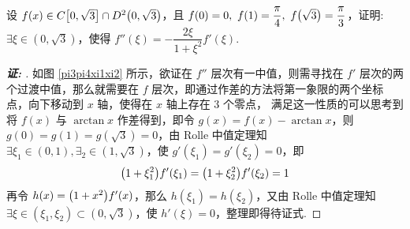 \begin{example}
    设 $f(x)\in C\qty[0,\sqrt{3}]\cap D^2\qty(0,\sqrt{3})$，且 $f(0)=0,~f(1)=\dfrac{\pi}{4},~f\qty(\sqrt{3})=\dfrac{\pi}{3}$，证明: $\exists\xi\in(0,\sqrt{3})$，使得 $f''(\xi)=-\dfrac{2\xi}{1+\xi^2}f'(\xi).$
\end{example}
\begin{proof}[{\songti \textbf{证: }}]
    如图 \ref{pi3pi4xi1xi2} 所示，欲证在 $f''$ 层次有一中值，则需寻找在 $f'$ 层次的两个过渡中值，那么就需要在 $f$ 层次，即通过作差的方法将第一象限的两个坐标点，向下移动到 $x$ 轴，使得在 $x$ 轴上存在 3 个零点，
    满足这一性质的可以思考到将 $f(x)$ 与 $\arctan x$ 作差得到，即令 $g(x)=f(x)-\arctan x$，则 $g(0)=g(1)=g(\sqrt{3})=0$，由 Rolle 中值定理知 $\exists\xi_1\in(0,1),\exists_2\in(1,\sqrt{3})$，使 $g'(\xi_1)=g'(\xi_2)=0$，即
    $$\qty(1+\xi_1^2)f'(\xi_1)=\qty(1+\xi_2^2)f'(\xi_2)=1$$
    再令 $h(x)=\qty(1+x^2)f'(x)$，那么 $h(\xi_1)=h(\xi_2)$，又由 Rolle 中值定理知 $\exists\xi\in(\xi_1,\xi_2)\subset(0,\sqrt{3})$，使 $h'(\xi)=0$，整理即得待证式.
\end{proof}


